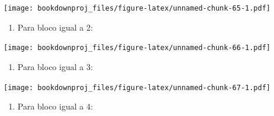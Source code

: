 \documentclass[
]{article}
\newenvironment{Shaded}{\begin{snugshade}}{\end{snugshade}}
\newcommand{\DataTypeTok}[1]{\textcolor[rgb]{0.13,0.29,0.53}{#1}}
\newcommand{\DecValTok}[1]{\textcolor[rgb]{0.00,0.00,0.81}{#1}}
\newcommand{\KeywordTok}[1]{\textcolor[rgb]{0.13,0.29,0.53}{\textbf{#1}}}
\newcommand{\NormalTok}[1]{#1}
\newcommand{\OperatorTok}[1]{\textcolor[rgb]{0.81,0.36,0.00}{\textbf{#1}}}
\newcommand{\StringTok}[1]{\textcolor[rgb]{0.31,0.60,0.02}{#1}}
\providecommand{\tightlist}{%
  \setlength{\itemsep}{0pt}\setlength{\parskip}{0pt}}
\begin{document}
\texttt{[image: bookdownproj\_files/figure-latex/unnamed-chunk-65-1.pdf]}

\begin{enumerate}
\def\labelenumi{\arabic{enumi}.}
\setcounter{enumi}{1}
\tightlist
\item
  Para bloco igual a 2:
\end{enumerate}

\begin{Shaded}
\end{Shaded}

\texttt{[image: bookdownproj\_files/figure-latex/unnamed-chunk-66-1.pdf]}

\begin{enumerate}
\def\labelenumi{\arabic{enumi}.}
\setcounter{enumi}{2}
\tightlist
\item
  Para bloco igual a 3:
\end{enumerate}

\begin{Shaded}
\end{Shaded}

\texttt{[image: bookdownproj\_files/figure-latex/unnamed-chunk-67-1.pdf]}

\begin{enumerate}
\def\labelenumi{\arabic{enumi}.}
\setcounter{enumi}{3}
\tightlist
\item
  Para bloco igual a 4:
\end{enumerate}

\begin{Shaded}
\end{Shaded}
\end{document}
